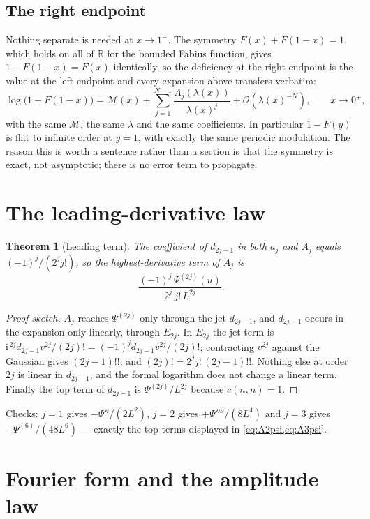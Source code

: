 \documentclass[11pt,oneside]{article}
\newtheorem{theorem}{Theorem}[section]
\theoremstyle{definition}
\theoremstyle{remark}
\newcommand{\R}{\mathbb R}
\newcommand{\ii}{\mathrm i}
\newcommand{\bigO}{\mathcal O}
\begin{document}
\subsection{The right endpoint}\label{sec:right}

Nothing separate is needed at $x\to1^-$.  The symmetry $F(x)+F(1-x)=1$,
which holds on all of $\R$ for the bounded Fabius function, gives
$1-F(1-x)=F(x)$ identically, so the deficiency at the right endpoint is the
value at the left endpoint and every expansion above transfers verbatim:
\[
  \log\bigl(1-F(1-x)\bigr)=\mathcal M(x)
    +\sum_{j=1}^{N-1}\frac{A_j(\lambda(x))}{\lambda(x)^j}
    +\bigO(\lambda(x)^{-N}),\qquad x\to0^+,
\]
with the same $\mathcal M$, the same $\lambda$ and the same coefficients.
In particular $1-F(y)$ is flat to infinite order at $y=1$, with exactly the
same periodic modulation.  The reason this is worth a sentence rather than a
section is that the symmetry is exact, not asymptotic; there is no error term
to propagate.

\section{The leading-derivative law}\label{sec:leading}

\begin{theorem}[Leading term]\label{thm:leading}
The coefficient of $d_{2j-1}$ in both $a_j$ and $A_j$ equals
$(-1)^j/(2^jj!)$, so the highest-derivative term of $A_j$ is
\[
  \frac{(-1)^j\,\Psi^{(2j)}(u)}{2^j\,j!\,L^{2j}}.
\]
\end{theorem}

\begin{proof}[Proof sketch]
$A_j$ reaches $\Psi^{(2j)}$ only through the jet $d_{2j-1}$, and $d_{2j-1}$
occurs in the expansion only linearly, through $E_{2j}$.  In $E_{2j}$ the jet
term is $\ii^{\,2j}d_{2j-1}v^{2j}/(2j)!=(-1)^jd_{2j-1}v^{2j}/(2j)!$; contracting
$v^{2j}$ against the Gaussian gives $(2j-1)!!$; and $(2j)!=2^jj!\,(2j-1)!!$.
Nothing else at order $2j$ is linear in $d_{2j-1}$, and the formal logarithm
does not change a linear term.  Finally the top term of $d_{2j-1}$ is
$\Psi^{(2j)}/L^{2j}$ because $c(n,n)=1$.
\end{proof}

Checks: $j=1$ gives $-\Psi''/(2L^2)$, $j=2$ gives $+\Psi''''/(8L^4)$ and $j=3$
gives $-\Psi^{(6)}/(48L^6)$ --- exactly the top terms displayed in
\cref{eq:A2psi,eq:A3psi}.

\section{Fourier form and the amplitude law}\label{sec:fourier}
\end{document}
